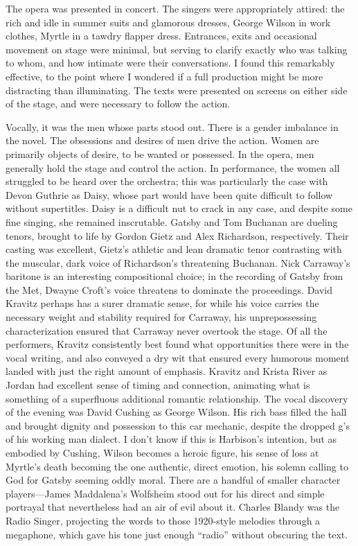 The opera was presented in concert. The singers were appropriately attired: the rich and idle in summer suits and glamorous dresses, George Wilson in work clothes, Myrtle in a tawdry flapper dress. Entrances, exits and occasional movement on stage were minimal, but serving to clarify exactly who was talking to whom, and how intimate were their conversations. I found this remarkably effective, to the point where I wondered if a full production might be more distracting than illuminating. The texts were presented on screens on either side of the stage, and were necessary to follow the action.

Vocally, it was the men whose parts stood out. There is a gender imbalance in the novel. The obsessions and desires of men drive the action. Women are primarily objects of desire, to be wanted or possessed. In the opera, men generally hold the stage and control the action. In performance, the women all struggled to be heard over the orchestra; this was particularly the case with Devon Guthrie as Daisy, whose part would have been quite difficult to follow without supertitles. Daisy is a difficult nut to crack in any case, and despite some fine singing, she remained inscrutable. Gatsby and Tom Buchanan are dueling tenors, brought to life by Gordon Gietz and Alex Richardson, respectively. Their casting was excellent, Gietz’s athletic and lean dramatic tenor contrasting with the muscular, dark voice of Richardson’s threatening Buchanan. Nick Carraway’s baritone is an interesting compositional choice; in the recording of Gatsby from the Met, Dwayne Croft’s voice threatens to dominate the proceedings. David Kravitz perhaps has a surer dramatic sense, for while his voice carries the necessary weight and stability required for Carraway, his unprepossessing characterization ensured that Carraway never overtook the stage. Of all the performers, Kravitz consistently best found what opportunities there were in the vocal writing, and also conveyed a dry wit that ensured every humorous moment landed with just the right amount of emphasis. Kravitz and Krista River as Jordan had excellent sense of timing and connection, animating what is something of a superfluous additional romantic relationship. The vocal discovery of the evening was David Cushing as George Wilson. His rich bass filled the hall and brought dignity and possession to this car mechanic, despite the dropped g’s of his working man dialect. I don’t know if this is Harbison’s intention, but as embodied by Cushing, Wilson becomes a heroic figure, his sense of loss at Myrtle’s death becoming the one authentic, direct emotion, his solemn calling to God for Gatsby seeming oddly moral. There are a handful of smaller character players—James Maddalena’s Wolfsheim stood out for his direct and simple portrayal that nevertheless had an air of evil about it. Charles Blandy was the Radio Singer, projecting the words to those 1920-style melodies through a megaphone, which gave his tone just enough “radio” without obscuring the text.

